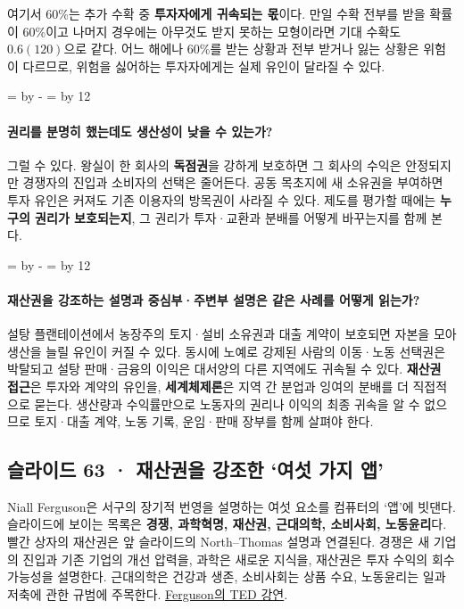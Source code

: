 \documentclass[10pt,a4paper]{article}
\newcommand{\ReserveQuestionSpace}{%
  \par\begingroup
  \dimen0=\pagegoal \advance\dimen0 by -\pagetotal
  \dimen2=\baselineskip \multiply\dimen2 by 12
  \ifdim\dimen0<\dimen2 \newpage\fi
  \endgroup}
\begin{document}
여기서 60\%는 추가 수확 중 \textbf{투자자에게 귀속되는 몫}이다. 만일 수확 전부를 받을 확률이 60\%이고 나머지 경우에는 아무것도 받지 못하는 모형이라면 기대 수확도 $0.6(120)$으로 같다. 어느 해에나 60\%를 받는 상황과 전부 받거나 잃는 상황은 위험이 다르므로, 위험을 싫어하는 투자자에게는 실제 유인이 달라질 수 있다.\par

\ReserveQuestionSpace
\paragraph{권리를 분명히 했는데도 생산성이 낮을 수 있는가?}
그럴 수 있다. 왕실이 한 회사의 \textbf{독점권}을 강하게 보호하면 그 회사의 수익은 안정되지만 경쟁자의 진입과 소비자의 선택은 줄어든다. 공동 목초지에 새 소유권을 부여하면 투자 유인은 커져도 기존 이용자의 방목권이 사라질 수 있다. 제도를 평가할 때에는 \textbf{누구의 권리가 보호되는지}, 그 권리가 투자·교환과 분배를 어떻게 바꾸는지를 함께 본다.\par

\ReserveQuestionSpace
\paragraph{재산권을 강조하는 설명과 중심부·주변부 설명은 같은 사례를 어떻게 읽는가?}
설탕 플랜테이션에서 농장주의 토지·설비 소유권과 대출 계약이 보호되면 자본을 모아 생산을 늘릴 유인이 커질 수 있다. 동시에 노예로 강제된 사람의 이동·노동 선택권은 박탈되고 설탕 판매·금융의 이익은 대서양의 다른 지역에도 귀속될 수 있다. \textbf{재산권 접근}은 투자와 계약의 유인을, \textbf{세계체제론}은 지역 간 분업과 잉여의 분배를 더 직접적으로 묻는다. 생산량과 수익률만으로 노동자의 권리나 이익의 최종 귀속을 알 수 없으므로 토지·대출 계약, 노동 기록, 운임·판매 장부를 함께 살펴야 한다.\par

\subsection{슬라이드 63 · 재산권을 강조한 ‘여섯 가지 앱’}
Niall Ferguson은 서구의 장기적 번영을 설명하는 여섯 요소를 컴퓨터의 ‘앱’에 빗댄다. 슬라이드에 보이는 목록은 \textbf{경쟁, 과학혁명, 재산권, 근대의학, 소비사회, 노동윤리}다. 빨간 상자의 재산권은 앞 슬라이드의 North–Thomas 설명과 연결된다. 경쟁은 새 기업의 진입과 기존 기업의 개선 압력을, 과학은 새로운 지식을, 재산권은 투자 수익의 회수 가능성을 설명한다. 근대의학은 건강과 생존, 소비사회는 상품 수요, 노동윤리는 일과 저축에 관한 규범에 주목한다. \href{https://www.ted.com/talks/niall\_ferguson\_the\_6\_killer\_apps\_of\_prosperity?view=transcript}{Ferguson의 TED 강연}.\par
\end{document}
